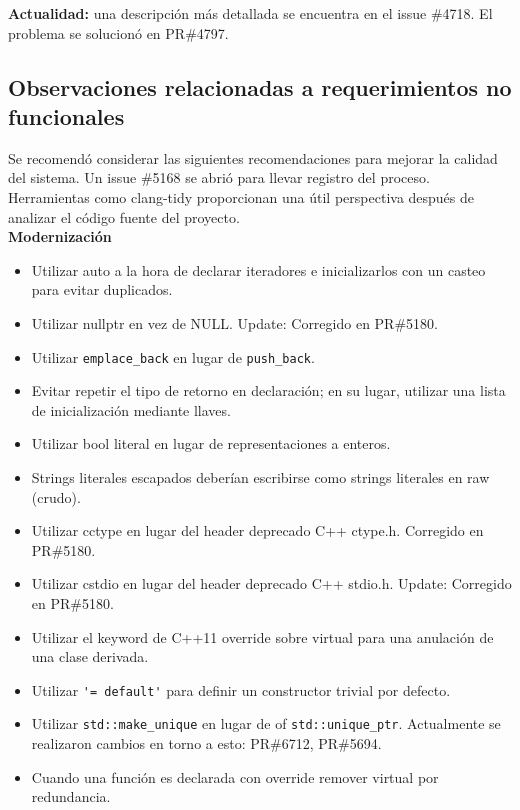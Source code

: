 \textbf{Actualidad:} una descripción más detallada se encuentra en el issue \#4718. El problema se solucionó en PR\#4797.

\subsection{Observaciones relacionadas a requerimientos no funcionales}

Se recomendó considerar las siguientes recomendaciones para mejorar la calidad del sistema. Un issue \#5168 se abrió para llevar registro del proceso. Herramientas como clang-tidy proporcionan una útil perspectiva después de analizar el código fuente del proyecto.\\

\textbf{Modernización}
\begin{itemize}
  \item Utilizar auto a la hora de declarar iteradores e inicializarlos con un casteo para evitar duplicados.
  \item Utilizar nullptr en vez de NULL. Update: Corregido en PR\#5180.
  \item Utilizar \verb|emplace_back| en lugar de \verb|push_back|.
  \item Evitar repetir el tipo de retorno en declaración; en su lugar, utilizar una lista de inicialización mediante llaves.
  \item Utilizar bool literal en lugar de representaciones a enteros.
  \item Strings literales escapados deberían escribirse como strings literales en raw (crudo).
  \item Utilizar cctype en lugar del header deprecado C++ ctype.h. Corregido en PR\#5180.
  \item Utilizar cstdio en lugar del header deprecado C++ stdio.h. Update: Corregido en PR\#5180.
  \item Utilizar el keyword de C++11 override sobre virtual para una anulación de una clase derivada.
  \item Utilizar \verb|'= default'| para definir un constructor trivial por defecto.
  \item Utilizar \verb|std::make_unique| en lugar de of \verb|std::unique_ptr|. Actualmente se realizaron cambios en torno a esto: PR\#6712, PR\#5694.
  \item Cuando una función es declarada con override remover virtual por redundancia.\\
\end{itemize}

